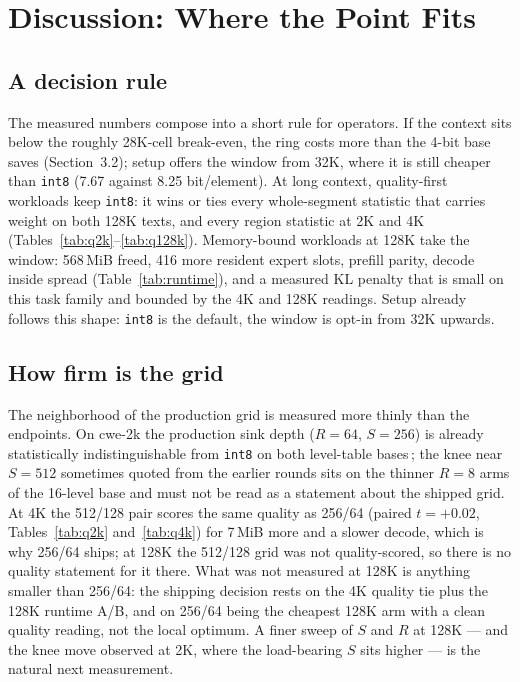 \documentclass[10pt,twocolumn]{article}
\begin{document}
\section{Discussion: Where the Point Fits}\label{sec:discussion}

\subsection{A decision rule}

The measured numbers compose into a short rule for operators. If the context sits below the roughly 28K-cell break-even, the ring costs more than the 4-bit base saves (Section~3.2); setup offers the window from 32K, where it is still cheaper than \texttt{int8} (7.67 against 8.25 bit/element). At long context, quality-first workloads keep \texttt{int8}: it wins or ties every whole-segment statistic that carries weight on both 128K texts, and every region statistic at 2K and 4K (Tables~\ref{tab:q2k}--\ref{tab:q128k}). Memory-bound workloads at 128K take the window: 568\,MiB freed, 416 more resident expert slots, prefill parity, decode inside spread (Table~\ref{tab:runtime}), and a measured KL penalty that is small on this task family and bounded by the 4K and 128K readings. Setup already follows this shape: \texttt{int8} is the default, the window is opt-in from 32K upwards.

\subsection{How firm is the grid}

The neighborhood of the production grid is measured more thinly than the endpoints. On cwe-2k the production sink depth ($R{=}64$, $S{=}256$) is already statistically indistinguishable from \texttt{int8} on both level-table bases\,\cite{strata-wp}; the knee near $S{=}512$ sometimes quoted from the earlier rounds sits on the thinner $R{=}8$ arms of the 16-level base and must not be read as a statement about the shipped grid. At 4K the 512/128 pair scores the same quality as 256/64 (paired $t{=}{+}0.02$, Tables~\ref{tab:q2k} and~\ref{tab:q4k}) for 7\,MiB more and a slower decode, which is why 256/64 ships; at 128K the 512/128 grid was not quality-scored, so there is no quality statement for it there. What was not measured at 128K is anything smaller than 256/64: the shipping decision rests on the 4K quality tie plus the 128K runtime A/B, and on 256/64 being the cheapest 128K arm with a clean quality reading, not the local optimum. A finer sweep of $S$ and $R$ at 128K --- and the knee move observed at 2K, where the load-bearing $S$ sits higher --- is the natural next measurement.
\end{document}
